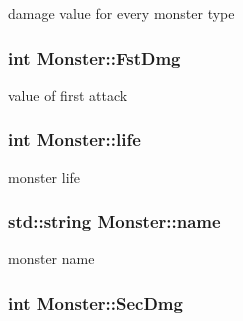 damage value for every monster type 

\subsubsection[{\texorpdfstring{Fst\+Dmg}{FstDmg}}]{\setlength{\rightskip}{0pt plus 5cm}int Monster\+::\+Fst\+Dmg\hspace{0.3cm}{\ttfamily [protected]}}\hypertarget{classMonster_aa75316144cd0ca5a4a1d7b76c4931e75}{}\label{classMonster_aa75316144cd0ca5a4a1d7b76c4931e75}


value of first attack 

\subsubsection[{\texorpdfstring{life}{life}}]{\setlength{\rightskip}{0pt plus 5cm}int Monster\+::life\hspace{0.3cm}{\ttfamily [protected]}}\hypertarget{classMonster_aae3dcfdec7021d8982361fefe7ad50e5}{}\label{classMonster_aae3dcfdec7021d8982361fefe7ad50e5}


monster life 

\subsubsection[{\texorpdfstring{name}{name}}]{\setlength{\rightskip}{0pt plus 5cm}std\+::string Monster\+::name\hspace{0.3cm}{\ttfamily [protected]}}\hypertarget{classMonster_ad32633c349f44cfc07b868ed4c27acde}{}\label{classMonster_ad32633c349f44cfc07b868ed4c27acde}


monster name 

\subsubsection[{\texorpdfstring{Sec\+Dmg}{SecDmg}}]{\setlength{\rightskip}{0pt plus 5cm}int Monster\+::\+Sec\+Dmg\hspace{0.3cm}{\ttfamily [protected]}}\hypertarget{classMonster_abafa6a490f5fd29b3925367c5989b1db}{}\label{classMonster_abafa6a490f5fd29b3925367c5989b1db}


